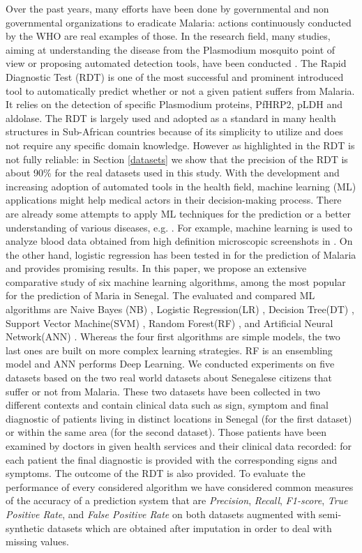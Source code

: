 Over the past years, many efforts have been done by governmental and non governmental organizations  to eradicate Malaria:  actions continuously conducted by the WHO are real examples of those.  In the research field, many studies, aiming at understanding the disease from the Plasmodium mosquito point of view or proposing automated detection tools, have been conducted \cite{Ga19,Le74,ermert2011development,Hu17}. The Rapid Diagnostic Test (RDT) \cite{Hu17} is one of the most successful and prominent introduced tool to automatically predict whether or not a given patient suffers from Malaria. It relies on the
detection of specific Plasmodium proteins, PfHRP2, pLDH
and aldolase. The RDT is largely used and adopted as a standard in many health structures in Sub-African countries because of its simplicity to utilize and does not require any specific domain knowledge. However as highlighted in \cite{Hu17} the RDT is not fully reliable:  in Section \ref{datasets} we show that the precision of the RDT is about 90\% for the real datasets used in this study.
With the development and increasing adoption of automated tools in the health field, machine learning  (ML) \cite{mitchell1997machine, Ug1} applications might help medical actors in their decision-making process. There are already some attempts to apply ML techniques for the prediction or a better understanding of various diseases, e.g. \cite{mbaye2019towards,gholami2017support}. For example, machine learning is used to analyze blood data obtained from high definition microscopic screenshots in \cite{gholami2017support}. On the other hand, logistic regression has been tested in \cite{mbaye2019towards} 
 for the prediction of Malaria and provides promising results.
 In this paper, we propose an  extensive comparative study of six machine learning algorithms, among the most popular for the prediction of Maria in Senegal. The evaluated and compared ML algorithms are Naive Bayes (NB) \cite{Ka17}, Logistic Regression(LR) \cite{Ph88},  Decision Tree(DT) \cite{Ro05}, Support Vector Machine(SVM) \cite{Ev01},
 Random Forest(RF) \cite{Be01},
 and Artificial Neural Network(ANN) \cite{Me19}. Whereas the four first algorithms are simple models, the two last ones are built on more complex learning strategies. RF is an ensembling model and ANN performs Deep Learning. We conducted experiments on five datasets based on the two real world datasets about Senegalese citizens that suffer or not from Malaria. These two datasets have been collected in two different contexts and contain clinical data such as sign, symptom and final diagnostic of patients living in distinct locations in Senegal (for the first dataset) or within the same area (for the second dataset). Those patients have been examined by doctors in given health services and their clinical data recorded: for each patient the final diagnostic is provided with the corresponding signs and symptoms. The outcome of the RDT is also provided. To evaluate the performance of every considered algorithm we have considered common measures of the accuracy of a prediction system that are \emph{Precision}, \emph{Recall}, \emph{F1-score}, \emph{True Positive Rate}, and
 \emph{False Positive Rate} on both datasets augmented with semi-synthetic datasets which are obtained after imputation in order to deal with missing values.
 
